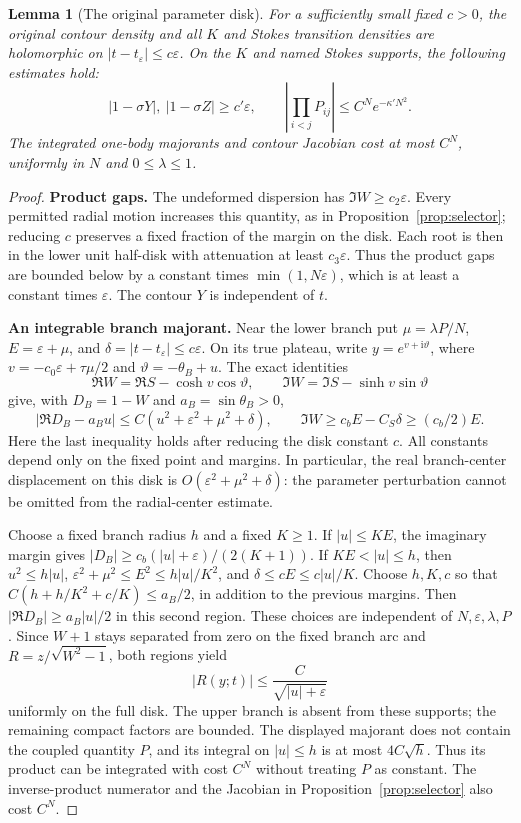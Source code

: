 \documentclass[11pt]{article}
\numberwithin{equation}{section}
\newtheorem{lemma}[theorem]{Lemma}
\theoremstyle{definition}
\newcommand{\ii}{\mathrm i}
\newcommand{\eps}{\varepsilon}
\newcommand{\se}{t_\varepsilon}
\begin{document}
\begin{lemma}[The original parameter disk]\label{lem:originaldisk}
For a sufficiently small fixed \(c>0\), the original contour
density and all \(K\) and Stokes transition densities are holomorphic
on \(|t-t_\eps|\le c\eps\). On the \(K\) and named Stokes
supports, the following estimates hold:
\[
 |1-\sigma Y|,\ |1-\sigma Z|\ge c'\eps,\qquad
 \left|\prod_{i<j}P_{ij}\right|\le C^Ne^{-\kappa' N^2}.
\]
The integrated one-body majorants and contour Jacobian cost
at most \(C^N\), uniformly in \(N\) and \(0\le\lambda\le1\).
\end{lemma}
\begin{proof}
\noindent\textbf{Product gaps.} The undeformed dispersion has \(\Im W\ge c_2\eps\).
Every permitted radial motion increases this quantity, as in
Proposition~\ref{prop:selector}; reducing \(c\) preserves a
fixed fraction of the margin on the disk. Each root is then
in the lower unit half-disk with attenuation at least \(c_3\eps\).
Thus the product gaps are bounded below by a constant times
\(\min(1,N\eps)\), which is at least a constant times \(\eps\).
The contour \(Y\) is independent of \(t\).

\par\smallskip\noindent\textbf{An integrable branch majorant.} Near the lower branch put \(\mu=\lambda P/N\),
\(E=\eps+\mu\), and \(\delta=|t-\se|\le c\eps\).
On its true plateau, write
\(y=e^{v+\ii\vartheta}\), where
\(v=-c_0\eps+\tau \mu/2\) and \(\vartheta=-\theta_B+u\).
The exact identities
\[
 \Re W=\Re S-\cosh v\cos\vartheta,\qquad
 \Im W=\Im S-\sinh v\sin\vartheta
\]
give, with \(D_B=1-W\) and \(a_B=\sin\theta_B>0\),
\[
 |\Re D_B-a_Bu|
 \le C(u^2+\eps^2+\mu^2+\delta),\qquad
 \Im W\ge c_bE-C_S\delta\ge(c_b/2)E.
\]
Here the last inequality holds after reducing the disk constant
\(c\). All constants depend only on the fixed point and margins.
In particular, the real branch-center displacement on this disk is
\(O(\eps^2+\mu^2+\delta)\): the parameter perturbation cannot be
omitted from the radial-center estimate.

Choose a fixed branch radius \(h\) and a fixed \(K\ge1\).
If \(|u|\le KE\), the imaginary margin gives
\(|D_B|\ge c_b(|u|+\eps)/(2(K+1))\).
If \(KE<|u|\le h\), then
\(u^2\le h|u|\), \(\eps^2+\mu^2\le E^2\le h|u|/K^2\),
and \(\delta\le cE\le c|u|/K\).
Choose \(h,K,c\) so that
\(C(h+h/K^2+c/K)\le a_B/2\), in addition to the previous margins.
Then \(|\Re D_B|\ge a_B|u|/2\) in this second region.
These choices are independent of \(N,\eps,\lambda,P\).
Since \(W+1\) stays separated from zero on the fixed branch arc
and \(R=z/\sqrt{W^2-1}\), both regions yield
\[
 |R(y;t)|\le \frac{C}{\sqrt{|u|+\eps}}
\]
uniformly on the full disk. The upper branch is absent from
these supports; the remaining compact factors are bounded.
The displayed majorant does not contain the coupled quantity
\(P\), and its integral on \(|u|\le h\) is at most \(4C\sqrt h\).
Thus its product can be integrated with cost \(C^N\) without
treating \(P\) as constant. The inverse-product numerator
and the Jacobian in Proposition~\ref{prop:selector} also cost \(C^N\).


\end{proof}
\end{document}
